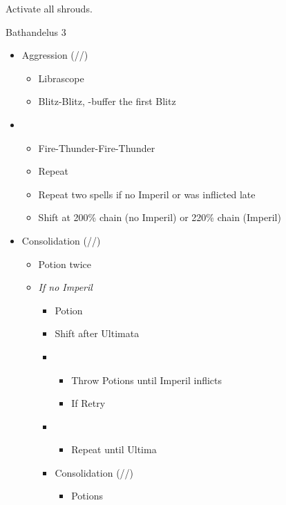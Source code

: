 \documentclass{report}
\begin{document}
\renewcommand{\second}{[2] Aggression (\com/\com/\rav)}
\renewcommand{\third}{[3] Consolidation (\sen/\sen/\med)}
\renewcommand{\fourth}{[4] Malevolence (\syn/\rav/\rav)}

Activate all shrouds.

\begin{battle}{Bathandelus 3}
\begin{multicols}{2}
\begin{itemize}
    \item \second
    \begin{itemize}
        \item Librascope
        \item Blitz-Blitz, \rav-buffer the first Blitz
    \end{itemize}
    \item \fifth
    \begin{itemize}
        \item Fire-Thunder-Fire-Thunder
        \item Repeat
        \item Repeat two spells if no Imperil or was inflicted late
        \item Shift at 200\% chain (no Imperil) or 220\% chain (Imperil)
    \end{itemize}
    \item \third
    \begin{itemize}
        \item Potion twice
        \item \textit{If no Imperil}
        \begin{itemize}
            \item Potion
            \item Shift after Ultimata
            \item \fifth
            \begin{itemize}
                \item Throw Potions until Imperil inflicts
                \item If \stagger Retry
            \end{itemize}
            \item \first
            \begin{itemize}
                \item Repeat until Ultima
            \end{itemize}
            \item \third
            \begin{itemize}
                \item Potions

\end{itemize}
\end{itemize}
\end{itemize}
\end{itemize}
\end{multicols}
\end{battle}
\end{document}
